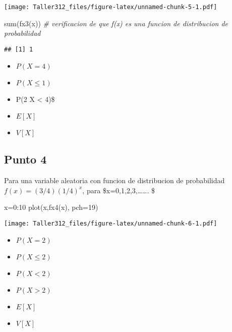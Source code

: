 \documentclass[
]{article}
\newenvironment{Shaded}{\begin{snugshade}}{\end{snugshade}}
\newcommand{\AttributeTok}[1]{\textcolor[rgb]{0.77,0.63,0.00}{#1}}
\newcommand{\CommentTok}[1]{\textcolor[rgb]{0.56,0.35,0.01}{\textit{#1}}}
\newcommand{\DecValTok}[1]{\textcolor[rgb]{0.00,0.00,0.81}{#1}}
\newcommand{\FunctionTok}[1]{\textcolor[rgb]{0.00,0.00,0.00}{#1}}
\newcommand{\NormalTok}[1]{#1}
\newcommand{\OtherTok}[1]{\textcolor[rgb]{0.56,0.35,0.01}{#1}}
\newcommand{\SpecialCharTok}[1]{\textcolor[rgb]{0.00,0.00,0.00}{#1}}
\begin{document}
\texttt{[image: Taller312\_files/figure-latex/unnamed-chunk-5-1.pdf]}

\begin{Shaded}
\begin{Highlighting}[]
\FunctionTok{sum}\NormalTok{(}\FunctionTok{fx3}\NormalTok{(x)) }\CommentTok{\# verificacion de que f(x) es una funcion de distribucion de probabilidad}
\end{Highlighting}
\end{Shaded}

\begin{verbatim}
## [1] 1
\end{verbatim}

\begin{itemize}
\item
  \(P(X=4)\)
\item
  \(P(X\leq 1)\)
\item
  P(2 \leq X \textless{} 4)\$
\item
  \(E[X]\)
\item
  \(V[X]\)
\end{itemize}

\hypertarget{punto-4}{%
\subsection{Punto 4}\label{punto-4}}

Para una variable aleatoria con funcion de distribucion de probabilidad
\(f(x)=(3/4)(1/4)^{x}\), para \$x=0,1,2,3,\ldots\ldots. \$

\begin{Shaded}
\begin{Highlighting}[]
\NormalTok{x}\OtherTok{=}\DecValTok{0}\SpecialCharTok{:}\DecValTok{10}
\FunctionTok{plot}\NormalTok{(x,}\FunctionTok{fx4}\NormalTok{(x), }\AttributeTok{pch=}\DecValTok{19}\NormalTok{)}
\end{Highlighting}
\end{Shaded}

\texttt{[image: Taller312\_files/figure-latex/unnamed-chunk-6-1.pdf]}

\begin{itemize}
\item
  \(P(X=2)\)
\item
  \(P(X\leq 2)\)
\item
  \(P(X < 2)\)
\item
  \(P(X > 2)\)
\item
  \(E[X]\)
\item
  \(V[X]\)
\end{itemize}
\end{document}
